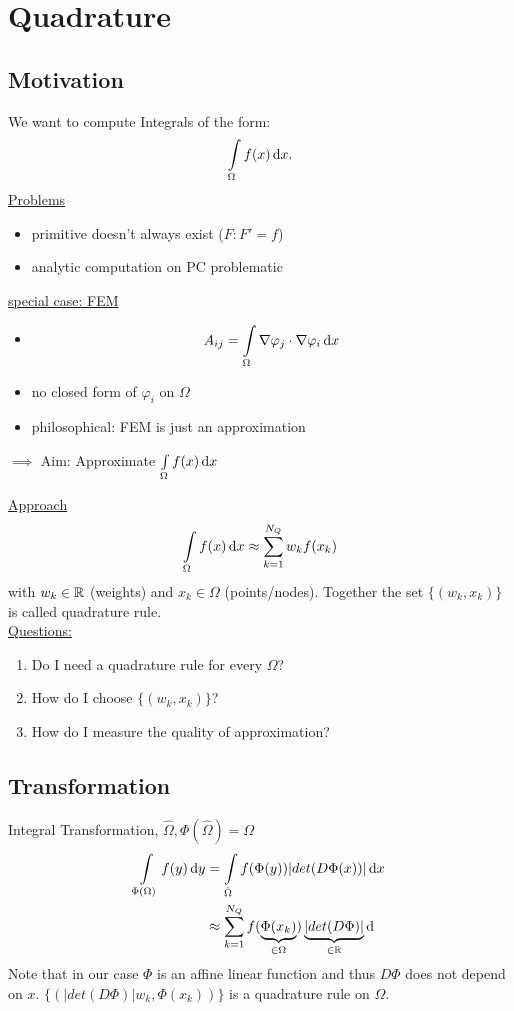 \section{Quadrature}

\subsection{Motivation}
We want to compute Integrals of the form:
\begin{align*}
	\int \limits_\Omega f(x) \mathop{}\!\mathrm{d} x.
\end{align*}
\underline{Problems}
\begin{itemize}
	\item primitive doesn't always exist ($F\colon F'=f$)
	\item analytic computation on PC problematic
\end{itemize}

 \underline{special case: FEM}
 \begin{itemize}
 	\item 
 	\begin{equation*}
 		A_{ij} = \int \limits_\Omega \nabla \varphi_j \cdot \nabla \varphi_i \mathop{}\!\mathrm{d} x
 	\end{equation*}
 	\item no closed form of $\varphi_i$ on $\Omega$
 	\item philosophical: FEM is just an approximation
 \end{itemize}

$\implies$ Aim: Approximate $\int \limits_\Omega f(x) \mathop{}\!\mathrm{d} x$

\underline{Approach}
\begin{equation*}
	\int \limits_\Omega f(x) \mathop{}\!\mathrm{d} x \approx \displaystyle \sum_{k=1}^{N_Q} w_k f(x_k)
\end{equation*}
with $w_k \in \mathbb{R}$ (weights) and $x_k \in \Omega$ (points/nodes). Together the set $\{(w_k,x_k)\}$ is called quadrature rule.\\
\underline{Questions:}
\begin{enumerate}[label=\arabic*)]
	\item Do I need a quadrature rule for every $\Omega$?
	\item How do I choose $\{(w_k,x_k)\}$?
	\item How do I measure the quality of approximation?
\end{enumerate}

\subsection{Transformation}
Integral Transformation, $\hat{\Omega}, \Phi(\hat{\Omega}) = \Omega$
\begin{align}
	\int \limits_{\Phi(\Omega)}  f(y) \mathop{}\!\mathrm{d} y &= \int \limits_{\hat{\Omega}} f(\Phi(y)) |det(D\Phi(x))| \mathop{}\!\mathrm{d} x \\
	&\approx \displaystyle \sum^{N_Q}_{k=1} f(\underbrace{\Phi(x_k)}_{\in \Omega}) \underbrace{|det(D\Phi)|}_{\in \mathbb{R}} \mathop{}\!\mathrm{d}
\end{align}
Note that in our case $\Phi$ is an affine linear function and thus $D\Phi$ does not depend on $x$.
$\{(|det(D\Phi)|w_k,\Phi(x_k))\}$ is a quadrature rule on $\Omega$.

